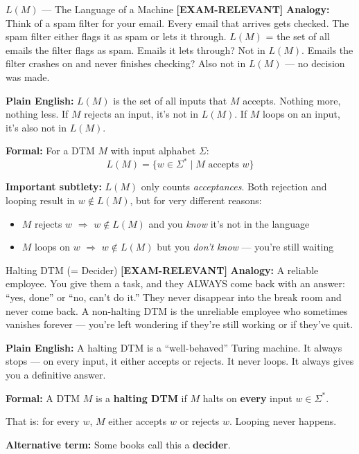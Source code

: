 \documentclass[11pt,a4paper]{article}
\newcommand{\kemark}{\textcolor{red!70!black}{\textbf{[EXAM-RELEVANT]}}}
\begin{document}
\begin{definitionbox}{$L(M)$ --- The Language of a Machine \kemark}
\textbf{Analogy:} Think of a spam filter for your email. Every email that arrives gets checked. The spam filter either flags it as spam or lets it through. $L(M)$ = the set of all emails the filter flags as spam. Emails it lets through? Not in $L(M)$. Emails the filter crashes on and never finishes checking? Also not in $L(M)$ --- no decision was made.

\textbf{Plain English:} $L(M)$ is the set of all inputs that $M$ accepts. Nothing more, nothing less. If $M$ rejects an input, it's not in $L(M)$. If $M$ loops on an input, it's also not in $L(M)$.

\textbf{Formal:} For a DTM $M$ with input alphabet $\Sigma$:
$$L(M) = \{w \in \Sigma^* \mid M \text{ accepts } w\}$$

\textbf{Important subtlety:} $L(M)$ only counts \textit{acceptances}. Both rejection and looping result in $w \notin L(M)$, but for very different reasons:
\begin{itemize}[nosep]
\item $M$ rejects $w$ $\Rightarrow$ $w \notin L(M)$ and you \textit{know} it's not in the language
\item $M$ loops on $w$ $\Rightarrow$ $w \notin L(M)$ but you \textit{don't know} --- you're still waiting
\end{itemize}
\end{definitionbox}

\begin{definitionbox}{Halting DTM (= Decider) \kemark}
\textbf{Analogy:} A reliable employee. You give them a task, and they ALWAYS come back with an answer: ``yes, done'' or ``no, can't do it.'' They never disappear into the break room and never come back. A non-halting DTM is the unreliable employee who sometimes vanishes forever --- you're left wondering if they're still working or if they've quit.

\textbf{Plain English:} A halting DTM is a ``well-behaved'' Turing machine. It always stops --- on every input, it either accepts or rejects. It never loops. It always gives you a definitive answer.

\textbf{Formal:} A DTM $M$ is a \textbf{halting DTM} if $M$ halts on \textbf{every} input $w \in \Sigma^*$.

That is: for every $w$, $M$ either accepts $w$ or rejects $w$. Looping never happens.

\textbf{Alternative term:} Some books call this a \textbf{decider}.
\end{definitionbox}
\end{document}
